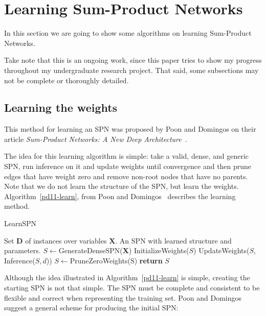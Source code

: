 \documentclass[a4paper,10pt]{article}
\theoremstyle{plain}
\begin{document}
\newpage

\section{Learning Sum-Product Networks}

In this section we are going to show some algorithms on learning Sum-Product Networks.

Take note that this is an ongoing work, since this paper tries to show my progress throughout my
undergraduate research project. That said, some subsections may not be complete or thoroughly
detailed.

\subsection{Learning the weights}

This method for learning an SPN was proposed by Poon and Domingos on their article
\textit{Sum-Product Networks: A New Deep Architecture}~\cite{poon-domingos}.

The idea for this learning algorithm is simple: take a valid, dense, and generic SPN, run inference
on it and update weights until convergence and then prune edges that have weight zero and remove
non-root nodes that have no parents. Note that we do not learn the structure of the SPN, but learn
the weights. Algorithm~\ref{pd11-learn}, from Poon and Domingos~\cite{poon-domingos} describes the
learning method.

\begin{algorithm}
  \caption{LearnSPN}\label{pd11-learn}
  \begin{algorithmic}[1]
    \Require Set $\mathbf{D}$ of instances over variables $\mathbf{X}$.
    \Ensure An SPN with learned structure and parameters.
    \State $S \gets $GenerateDenseSPN($\mathbf{X}$)
    \State InitializeWeights($S$)
    \Repeat
      \State UpdateWeights($S$, Inference($S,d$))
      \EndFor
    \State $S \gets $PruneZeroWeights(S)
    \State \textbf{return} $S$
  \end{algorithmic}
\end{algorithm}

Although the idea illustrated in Algorithm~\ref{pd11-learn} is simple, creating the starting SPN is
not that simple. The SPN must be complete and consistent to be flexible and correct when
representing the training set. Poon and Domingos suggest a general scheme for producing the initial
SPN\@:
\end{document}
